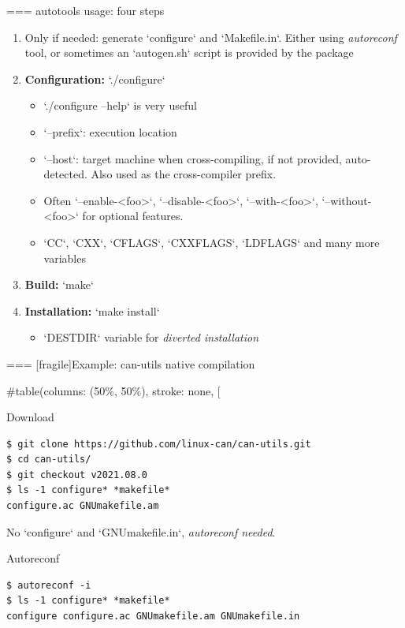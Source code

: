 === {autotools usage: four steps}
  \begin{enumerate}
  \item Only if needed: generate `configure` and
    `Makefile.in`. Either using {\em autoreconf} tool, or
    sometimes an `autogen.sh` script is provided by the package
  \item {\bf Configuration:} `./configure`
    \begin{itemize}
    \item `./configure --help` is very useful
    \item `--prefix`: execution location
    \item `--host`: target machine when cross-compiling, if not
      provided, auto-detected. Also used as the cross-compiler prefix.
    \item Often `--enable-<foo>`, `--disable-<foo>`,
      `--with-<foo>`, `--without-<foo>` for optional
      features.
    \item `CC`, `CXX`, `CFLAGS`, `CXXFLAGS`,
      `LDFLAGS` and many more variables
    \end{itemize}
  \item {\bf Build:} `make`
  \item {\bf Installation:} `make install`
    \begin{itemize}
    \item `DESTDIR` variable for {\em diverted installation}
    \end{itemize}
  \end{enumerate}


=== [fragile]{Example: can-utils native compilation}
  
#table(columns: (50\%, 50\%), stroke: none,
[
  \begin{block}{Download}
    {\tiny
\begin{verbatim}
$ git clone https://github.com/linux-can/can-utils.git
$ cd can-utils/
$ git checkout v2021.08.0
$ ls -1 configure* *makefile*
configure.ac GNUmakefile.am
\end{verbatim}
    }
  \end{block}

  {\small No `configure` and
    `GNUmakefile.in`, {\em autoreconf needed}.}

  \begin{block}{Autoreconf}
    {\tiny
\begin{verbatim}
$ autoreconf -i
$ ls -1 configure* *makefile*
configure configure.ac GNUmakefile.am GNUmakefile.in
\end{verbatim}
    }
  \end{block}

